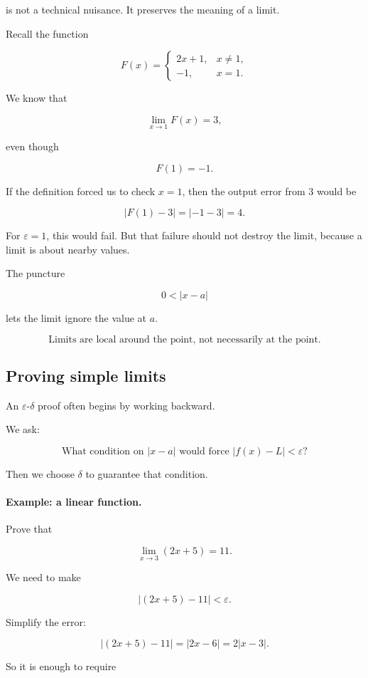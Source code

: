 is not a technical nuisance.  It preserves the meaning of a limit.

Recall the function

\[
F(x)=
\begin{cases}
2x+1, & x\neq1,\\
-1, & x=1.
\end{cases}
\]

We know that

\[
\lim_{x\to1}F(x)=3,
\]

even though

\[
F(1)=-1.
\]

If the definition forced us to check \(x=1\), then the output error from \(3\) would be

\[
|F(1)-3|=|-1-3|=4.
\]

For \(\varepsilon=1\), this would fail.  But that failure should not destroy the limit, because a limit is about nearby values.

The puncture

\[
0<|x-a|
\]

lets the limit ignore the value at \(a\).

\[
\boxed{\text{Limits are local around the point, not necessarily at the point.}}
\]

\subsection{Proving simple limits}
\label{subsec:proving-simple-limits}

An \(\varepsilon\)-\(\delta\) proof often begins by working backward.

We ask:

\[
\text{What condition on }|x-a|\text{ would force }|f(x)-L|<\varepsilon?
\]

Then we choose \(\delta\) to guarantee that condition.

\paragraph{Example: a linear function.}
Prove that

\[
\lim_{x\to3}(2x+5)=11.
\]

We need to make

\[
|(2x+5)-11|<\varepsilon.
\]

Simplify the error:

\[
|(2x+5)-11|
=
|2x-6|
=
2|x-3|.
\]

So it is enough to require

